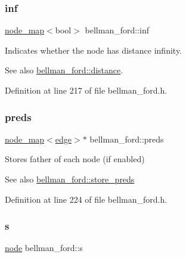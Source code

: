 \subsubsection{\texorpdfstring{inf}{inf}}
{\footnotesize\ttfamily \mbox{\hyperlink{classnode__map}{node\+\_\+map}}$<$bool$>$ bellman\+\_\+ford\+::inf\hspace{0.3cm}{\ttfamily [private]}}



Indicates whether the node has distance infinity. 

\begin{DoxySeeAlso}{See also}
\mbox{\hyperlink{classbellman__ford_a881e5b021e69aced997185208438f910}{bellman\+\_\+ford\+::distance}}. 
\end{DoxySeeAlso}


Definition at line 217 of file bellman\+\_\+ford.\+h.

\mbox{\label{classbellman__ford_a1ce37529c697ec5b89e8dc09204e4f59}} 
\subsubsection{\texorpdfstring{preds}{preds}}
{\footnotesize\ttfamily \mbox{\hyperlink{classnode__map}{node\+\_\+map}}$<$\mbox{\hyperlink{classedge}{edge}}$>$$\ast$ bellman\+\_\+ford\+::preds\hspace{0.3cm}{\ttfamily [private]}}



Stores father of each node (if enabled) 

\begin{DoxySeeAlso}{See also}
\mbox{\hyperlink{classbellman__ford_aac87169a3cf4f95477ce215a0cb7a12b}{bellman\+\_\+ford\+::store\+\_\+preds}} 
\end{DoxySeeAlso}


Definition at line 224 of file bellman\+\_\+ford.\+h.

\mbox{\label{classbellman__ford_a2d6ce715e65b26822c622b322811c3b0}} 
\subsubsection{\texorpdfstring{s}{s}}
{\footnotesize\ttfamily \mbox{\hyperlink{classnode}{node}} bellman\+\_\+ford\+::s\hspace{0.3cm}{\ttfamily [private]}}



